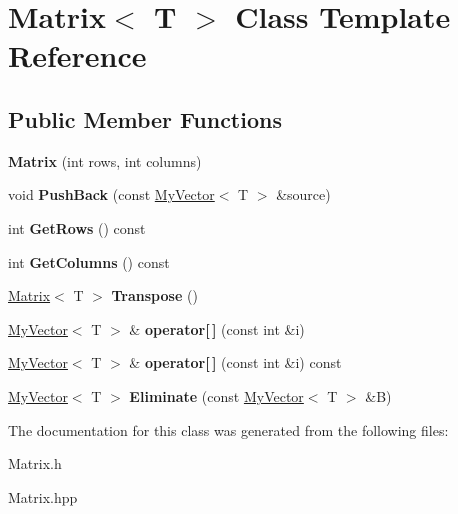 \hypertarget{class_matrix}{}\section{Matrix$<$ T $>$ Class Template Reference}
\label{class_matrix}
\subsection*{Public Member Functions}
\begin{DoxyCompactItemize}
\item 
\mbox{\label{class_matrix_a44eb4cf3a243fe027112d1ace474ead9}} 
{\bfseries Matrix} (int rows, int columns)
\item 
\mbox{\label{class_matrix_af61aaa671b6bd354b27fb3aabbb65a9d}} 
void {\bfseries Push\+Back} (const \mbox{\hyperlink{class_my_vector}{My\+Vector}}$<$ T $>$ \&source)
\item 
\mbox{\label{class_matrix_aa665db4bc173a7bb4ec3f9da2676dfa6}} 
int {\bfseries Get\+Rows} () const
\item 
\mbox{\label{class_matrix_ada60917bb197292e0645992e108c2c2f}} 
int {\bfseries Get\+Columns} () const
\item 
\mbox{\label{class_matrix_a86d55a5db43b641f4e8fb2b302ccc599}} 
\mbox{\hyperlink{class_matrix}{Matrix}}$<$ T $>$ {\bfseries Transpose} ()
\item 
\mbox{\label{class_matrix_aa9532c87a69bef256954e2309ca3fdd6}} 
\mbox{\hyperlink{class_my_vector}{My\+Vector}}$<$ T $>$ \& {\bfseries operator\mbox{[}$\,$\mbox{]}} (const int \&i)
\item 
\mbox{\label{class_matrix_a56c7f18f272e74bee2b616eba702fc87}} 
\mbox{\hyperlink{class_my_vector}{My\+Vector}}$<$ T $>$ \& {\bfseries operator\mbox{[}$\,$\mbox{]}} (const int \&i) const
\item 
\mbox{\label{class_matrix_a427a50c20bb056fd20bdf2740995f8c1}} 
\mbox{\hyperlink{class_my_vector}{My\+Vector}}$<$ T $>$ {\bfseries Eliminate} (const \mbox{\hyperlink{class_my_vector}{My\+Vector}}$<$ T $>$ \&B)
\end{DoxyCompactItemize}


The documentation for this class was generated from the following files\+:\begin{DoxyCompactItemize}
\item 
Matrix.\+h\item 
Matrix.\+hpp\end{DoxyCompactItemize}
